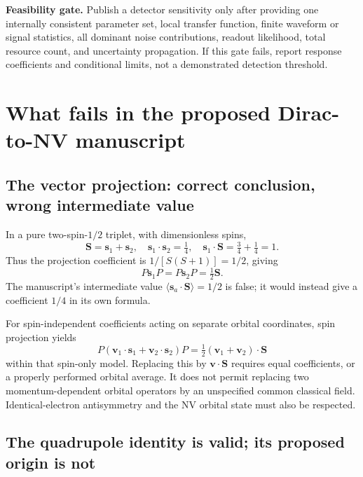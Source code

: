 \documentclass[a4paper,11pt]{article}
\begin{document}
\textbf{Feasibility gate.} Publish a detector sensitivity only after providing one internally consistent parameter set, local transfer function, finite waveform or signal statistics, all dominant noise contributions, readout likelihood, total resource count, and uncertainty propagation. If this gate fails, report response coefficients and conditional limits, not a demonstrated detection threshold.

\section{What fails in the proposed Dirac-to-NV manuscript}
\label{sec:projection}

\subsection{The vector projection: correct conclusion, wrong intermediate value}

In a pure two-spin-$1/2$ triplet, with dimensionless spins,
\begin{equation}
 \bm S=\bm s_1+\bm s_2,\quad
 \bm s_1\cdot\bm s_2=\tfrac14,\quad
 \bm s_1\cdot\bm S=\tfrac34+\tfrac14=1.
\end{equation}
Thus the projection coefficient is $1/[S(S+1)]=1/2$, giving
\begin{equation}
 P\bm s_1P=P\bm s_2P=\tfrac12\bm S.
\end{equation}
The manuscript's intermediate value $\langle\bm s_a\cdot\bm S\rangle=1/2$ is false; it would instead give a coefficient $1/4$ in its own formula.

For spin-independent coefficients acting on separate orbital coordinates, spin projection yields
\begin{equation}
 P(\bm v_1\cdot\bm s_1+\bm v_2\cdot\bm s_2)P
 =\tfrac12(\bm v_1+\bm v_2)\cdot\bm S
\end{equation}
within that spin-only model. Replacing this by $\bm v\cdot\bm S$ requires equal coefficients, or a properly performed orbital average. It does not permit replacing two momentum-dependent orbital operators by an unspecified common classical field. Identical-electron antisymmetry and the NV orbital state must also be respected.

\subsection{The quadrupole identity is valid; its proposed origin is not}
\end{document}
